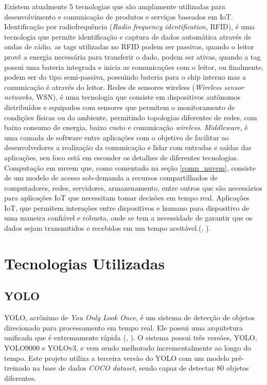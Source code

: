 \documentclass[]{politex}
\begin{document}
Existem atualmente 5 tecnologias que são amplamente utilizadas para desenvolvimento e comunicação de produtos e serviços baseados em IoT. Identificação por radiofrequência (\textit{Radio frequency identification}, RFID), é uma tecnologia que permite identificação e captura de dados automática através de ondas de rádio, as tags utilizadas no RFID podem ser passivas, quando o leitor provê a energia necessária para transferir o dado, podem ser ativas, quando a tag possui uma bateria integrada e inicia as comunicações com o leitor, ou finalmente, podem ser do tipo semi-passiva, possuindo bateria para o chip interno mas a comunicação é através do leitor. Redes de sensores wireless (\textit{Wireless sensor networks}, WSN), é uma tecnologia que consiste em dispositivos autônomos distribuídos e equipados com sensores que permitem o monitoramento de condições físicas ou do ambiente, permitindo topologias diferentes de redes, com baixo consumo de energia, baixo custo e comunicação \textit{wireless}. \textit{Middleware}, é uma camada de software entre aplicações com o objetivo de facilitar ao desenvolvedores a realização da comunicação e lidar com entradas e saídas das aplicações, seu foco está em esconder os detalhes de diferentes tecnologias. Computação em nuvem que, como comentado na seção \ref{comp_nuvem}, consiste de um modelo de acesso sob-demanda a recursos compartilhados de computadores, redes, servidores, armazenamento, entre outros que são necessários para aplicações IoT que necessitam tomar decisões em tempo real. Aplicações IoT, que permitem interações entre dispositivos e humano para dispositivo de uma maneira confiável e robusta, onde se tem a necessidade de garantir que os dados sejam transmitidos e recebidos em um tempo aceitável.(, \citeyear{iot_lee}).


\chapter{Tecnologias Utilizadas}
\section{YOLO} \label{yolo}
YOLO, acrônimo de \textit{You Only Look Once}, é um sistema de detecção de objetos direcionado para processamento em tempo real. Ele possui uma arquitetura unificada que é extremamente rápida (, \citeyear{yolov1}). O sistema possui três versões, YOLO, YOLO9000 e YOLOv3, e vem sendo melhorado incrementalmente ao longo do tempo. Este projeto utiliza a terceira versão do YOLO com um modelo pré-treinado na base de dados \textit{COCO dataset}, sendo capaz de detectar 80 objetos diferentes.
\end{document}
